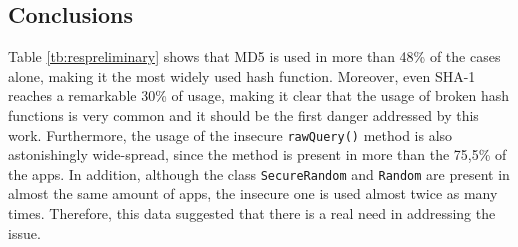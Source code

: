\subsection{Conclusions}
Table \ref{tb:respreliminary} shows that MD5 is used in more than 48\% of the cases alone, making it the most widely used hash function. Moreover, even SHA-1 reaches a remarkable 30\% of usage, making it clear that the usage of broken hash functions is very common and it should be the first danger addressed by this work. Furthermore, the usage of the insecure \texttt{rawQuery()} method is also astonishingly wide-spread, since the method is present in more than the 75,5\% of the apps. In addition, although the class \texttt{SecureRandom} and \texttt{Random} are present in almost the same amount of apps, the insecure one is used almost twice as many times. Therefore, this data suggested that there is a real need in addressing the issue.


